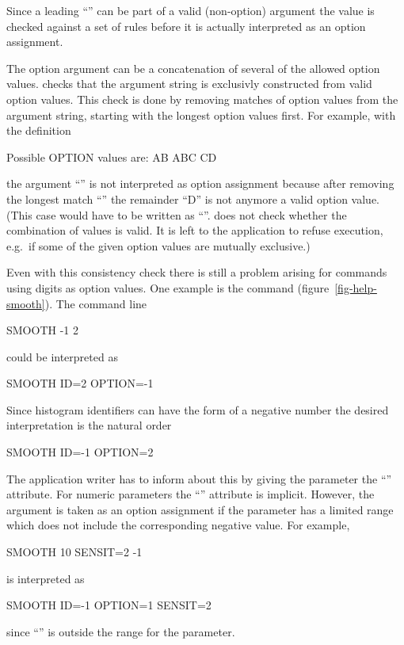 Since a leading ``\Lit{-}'' can be part of a valid (non-option)
argument the value is checked against a set of rules before it is
actually interpreted as an option assignment.

The option argument can be a concatenation of several of the allowed
option values.
\KUIP{} checks that the argument string is exclusivly constructed from
valid option values.
This check is done by removing matches of option values from the
argument string, starting with the longest option values first.
For example, with the definition
\begin{XMP}
   Possible OPTION values are:
\vspace{-.5\baselineskip}
    AB
    ABC
    CD
\end{XMP}
the argument ``'' is not interpreted as option
assignment because after removing the longest match ``''
the remainder ``D'' is not anymore a valid option value.
(This case would have to be written as ``''.
\KUIP{} does not check whether the combination of values is valid.
It is left to the application to refuse execution, e.g.\ if some of the
given option values are mutually exclusive.)

Even with this consistency check there is still a problem arising for
commands using digits as option values.
One example is the 
\ifPAWman
\else
\PAW{} 
\fi
command 
(figure~\ref{fig-help-smooth}). 
The command line 
\begin{XMP}
SMOOTH -1 2
\end{XMP}
could be interpreted as
\begin{XMP}
SMOOTH ID=2 OPTION=-1
\end{XMP}
Since histogram identifiers can have the form of a negative number
the desired interpretation is the natural order
\begin{XMP}
SMOOTH ID=-1 OPTION=2
\end{XMP}
The application writer has to inform \KUIP{} about this by giving the
 parameter the ``'' attribute.
For numeric parameters the ``'' attribute is implicit.
However, the argument is taken as an option assignment if the
parameter has a limited range which does not include the corresponding
negative value.
For example, 
\begin{XMP}
SMOOTH 10 SENSIT=2 -1
\end{XMP}
is interpreted as
\begin{XMP}
SMOOTH ID=-1 OPTION=1 SENSIT=2
\end{XMP}
since ``'' is outside the range for the 
parameter.

